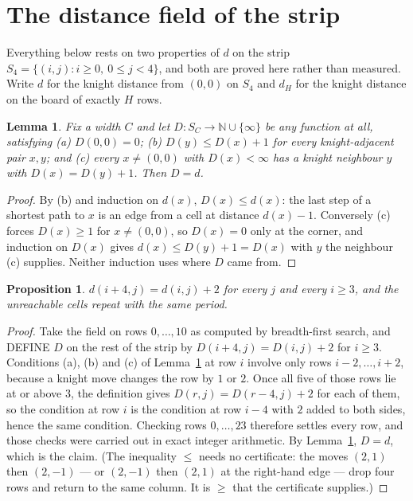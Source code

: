 \documentclass[11pt,a4paper]{article}
\theoremstyle{plain}
\newtheorem{lemma}[theorem]{Lemma}
\newtheorem{proposition}[theorem]{Proposition}
\theoremstyle{definition}
\begin{document}
\section{The distance field of the strip}

Everything below rests on two properties of $d$ on the strip $S_{4}=\{(i,j): i\ge 0,\ 0\le j<4\}$, and both are proved here rather than measured. Write $d$ for the knight distance from $(0,0)$ on $S_{4}$ and $d_H$ for the knight distance on the board of exactly $H$ rows.

\begin{lemma}\label{lem:bellman}
Fix a width $C$ and let $D:S_C\to\mathbb{N}\cup\{\infty\}$ be any function at all, satisfying
(a) $D(0,0)=0$; (b) $D(y)\le D(x)+1$ for every knight-adjacent pair $x,y$; and
(c) every $x\ne(0,0)$ with $D(x)<\infty$ has a knight neighbour $y$ with $D(x)=D(y)+1$. Then $D=d$.
\end{lemma}

\begin{proof}
By (b) and induction on $d(x)$, $D(x)\le d(x)$: the last step of a shortest path to $x$ is an edge from a cell at distance $d(x)-1$. Conversely (c) forces $D(x)\ge1$ for $x\ne(0,0)$, so $D(x)=0$ only at the corner, and induction on $D(x)$ gives $d(x)\le D(y)+1=D(x)$ with $y$ the neighbour (c) supplies. Neither induction uses where $D$ came from.
\end{proof}

\begin{proposition}\label{prop:period}
$d(i+4,j)=d(i,j)+2$ for every $j$ and every $i\ge3$, and the unreachable cells repeat with the same period.
\end{proposition}

\begin{proof}
Take the field on rows $0,\dots,10$ as computed by breadth-first search, and DEFINE $D$ on the rest of the strip by $D(i+4,j)=D(i,j)+2$ for $i\ge3$. Conditions (a), (b) and (c) of Lemma~\ref{lem:bellman} at row $i$ involve only rows $i-2,\dots,i+2$, because a knight move changes the row by $1$ or $2$. Once all five of those rows lie at or above $3$, the definition gives $D(r,j)=D(r-4,j)+2$ for each of them, so the condition at row $i$ is the condition at row $i-4$ with $2$ added to both sides, hence the same condition. Checking rows $0,\dots,23$ therefore settles every row, and those checks were carried out in exact integer arithmetic. By Lemma~\ref{lem:bellman}, $D=d$, which is the claim. (The inequality $\le$ needs no certificate: the moves $(2,1)$ then $(2,-1)$ --- or $(2,-1)$ then $(2,1)$ at the right-hand edge --- drop four rows and return to the same column. It is $\ge$ that the certificate supplies.)
\end{proof}
\end{document}
